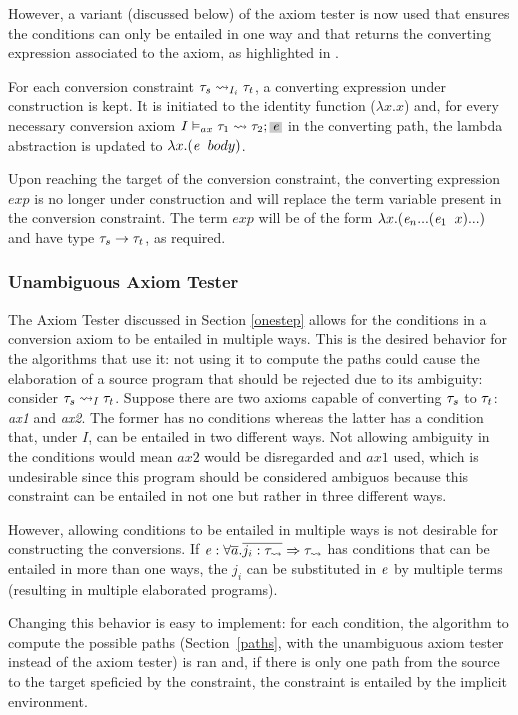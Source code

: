 However, a variant (discussed below) of the axiom tester is now used that ensures the conditions can only be entailed in one way and that returns the converting expression associated to the axiom, as highlighted in .

For each conversion constraint $\convX{\imEnv_i}{\type_{s}}{\type_{t}}$, a converting expression under construction is kept. It is initiated to the identity function ($\lambda x. x$) and, for every necessary conversion axiom $\convax{\imEnv}{\type_1}{\type_2}{\term}$ in the converting path, the lambda abstraction is updated to $\lambda x . (\term \;\;body)$.

Upon reaching the target of the conversion constraint, the converting expression $exp$ is no longer under construction and will replace the term variable present in the conversion constraint. The term $exp$ will be of the form $\lambda x . (\term_n ... (\term_1\;\;x)...)$ and have type $\type_s \to \type_t$, as required.

\subsubsection{Unambiguous Axiom Tester}

The Axiom Tester discussed in Section \ref{onestep} allows for the conditions in a conversion axiom to be entailed in multiple ways. This is the desired behavior for the algorithms that use it:  not using it to compute the paths could cause the elaboration of a source program that should be rejected due to its ambiguity: consider  $\convX{\imEnv}{\type_s}{\type_t}$. Suppose there are two axioms capable of converting $\type_s$ to $\type_t$: \textit{ax1} and \textit{ax2}. The former has no conditions whereas the latter has a condition that, under $I$, can be entailed in two different ways. Not allowing ambiguity in the conditions would mean $ax2$ would be disregarded and $ax1$ used, which is undesirable since this program should be considered ambiguos because this constraint can be entailed in not one but rather in three different ways.

However, allowing conditions to be entailed in multiple ways is not desirable for constructing the conversions. If $\term :\forall \overline{a} . \overline{j_i : \convmono} \Rightarrow \convmono$ has conditions that can be entailed in more than one ways, the $j_i$ can be substituted in $\term$ by multiple terms (resulting in multiple elaborated programs).

Changing this behavior is easy to implement: for each condition, the algorithm to compute the possible paths (Section~\ref{paths}, with the unambiguous axiom tester instead of the axiom tester) is ran and, if there is only one path from the source to the target speficied by the constraint, the constraint is entailed by the implicit environment.

